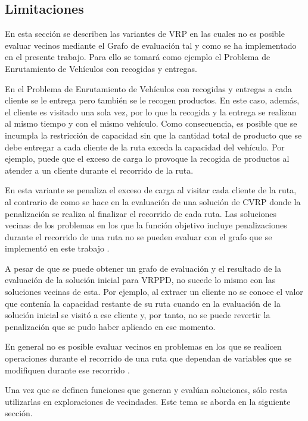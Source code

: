 \subsection{Limitaciones}

En esta sección se describen las variantes de VRP en las cuales no es posible evaluar vecinos mediante el Grafo de evaluación tal y como se ha implementado en el presente trabajo. Para ello se tomará como ejemplo el Problema de Enrutamiento de Vehículos con recogidas y entregas. 

En el Problema de Enrutamiento de Vehículos con recogidas y entregas a cada cliente se le entrega pero también se le recogen productos. En este caso, además, el cliente es visitado una sola vez, por lo que la recogida y la entrega se realizan al mismo tiempo y con el mismo vehículo. Como consecuencia, es posible que se incumpla la restricción de capacidad sin que la cantidad total de producto que se debe entregar a cada cliente de la ruta exceda la capacidad del vehículo. Por ejemplo, puede que el exceso de carga lo provoque la recogida de productos al atender a un cliente durante el recorrido de la ruta.

En esta variante se penaliza el exceso de carga al visitar cada cliente de la ruta, al contrario de como se hace en la evaluación de una solución de CVRP donde la penalización se realiza al finalizar el recorrido de cada ruta. Las soluciones vecinas de los problemas en los que la función objetivo incluye penalizaciones durante el recorrido de una ruta no se pueden evaluar con el grafo que se implementó en este trabajo \cite{JJ}.

A pesar de que se puede obtener un grafo de evaluación y el resultado de la evaluación de la solución inicial para VRPPD, no sucede lo mismo con las soluciones vecinas de esta. Por ejemplo, al extraer un cliente no se conoce el valor que contenía la capacidad restante de su ruta cuando en la evaluación de la solución inicial se visitó a ese cliente y, por tanto, no se puede revertir la penalización que se pudo haber aplicado en ese momento.

En general no es posible evaluar vecinos en problemas en los que se realicen operaciones durante el recorrido de una ruta que dependan de variables que se modifiquen durante ese recorrido \cite{JJ}.

Una vez que se definen funciones que generan y evalúan soluciones, sólo resta utilizarlas en exploraciones de vecindades. Este tema se aborda en la siguiente sección.

